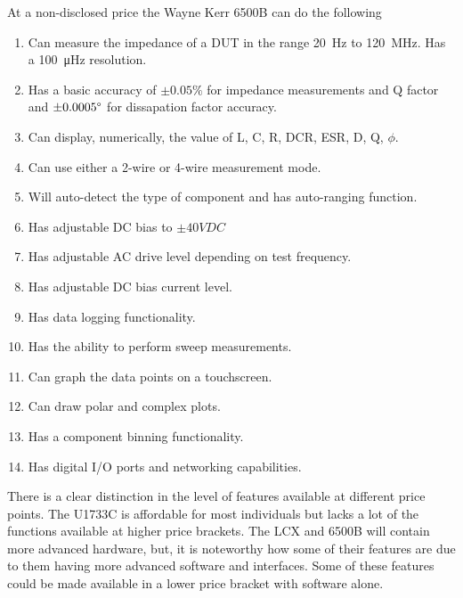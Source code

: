   At a non-disclosed price the Wayne Kerr 6500B can do the following
\begin{enumerate}
    \item Can measure the impedance of a DUT in the range \SI[]{20}{\hertz} to \SI[]{120}{\mega\hertz}. Has a \SI[]{100}{\micro\hertz} resolution. 
    \item Has a basic accuracy of $\pm 0.05\%$ for impedance measurements and Q factor and $\pm 0.0005\degree$ for dissapation factor accuracy.
    \item Can display, numerically, the value of L, C, R, DCR, ESR, D, Q, $\phi$.
    \item Can use either a 2-wire or 4-wire measurement mode.
    \item Will auto-detect the type of component and has auto-ranging function.
    \item Has adjustable DC bias to $\pm 40VDC$
    \item Has adjustable AC drive level depending on test frequency.
    \item Has adjustable DC bias current level.
    \item Has data logging functionality.
    \item Has the ability to perform sweep measurements.
    \item Can graph the data points on a touchscreen.
    \item Can draw polar and complex plots.
    \item Has a component binning functionality.
    \item Has digital I/O ports and networking capabilities.
  \end{enumerate}

  There is a clear distinction in the level of features available at different price points. The U1733C is affordable for most individuals but lacks a lot of the functions available at higher price brackets. The LCX and 6500B will contain more advanced hardware, but, it is noteworthy how some of their features are due to them having more advanced software and interfaces. Some of these features could be made available in a lower price bracket with software alone.
